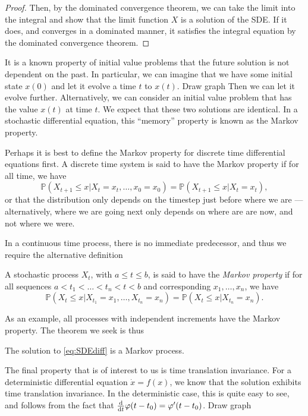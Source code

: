 \documentclass[prb,12pt]{revtex4-2}
\theoremstyle{definition}
\theoremstyle{definition}
\theoremstyle{definition}
\begin{document}
{\begin{proof}
{		Then, by the dominated convergence theorem, we can take the limit into the integral and show that the limit function $X$ is a solution of the SDE.
		}
		If it does, and converges in a dominated manner, it satisfies the integral equation by the dominated convergence theorem. 
	\end{proof}
	It is a known property of initial value problems that the future solution is not dependent on the past. In particular, we can imagine that we have some initial state $x(0)$ and let it evolve a time $t$ to $x(t)$. {\color{red} Draw graph} Then we can let it evolve further. Alternatively, we can consider an initial value problem that has the value $x(t)$ at time $t$. We expect that these two solutions are identical. In a stochastic differential equation, this ``memory'' property is known as the Markov property. {\color{red} Perhaps it is best to define the Markov property for discrete time differential equations first. A discrete time system is said to have the Markov property if for all time, we have
		\[\mathbb{P}(X_{t+1} \le x | X_t = x_t, \dots, x_0 = x_0) = \mathbb{P}(X_{t+1} \le x | X_t = x_t),\]
		or that the distribution only depends on the timestep just before where we are --- alternatively, where we are going next only depends on where are are now, and not where we were.
		
		In a continuous time process, there is no immediate predecessor, and thus we require the alternative definition} 
	\begin{Definition}
		A stochastic process $X_t$, with $a\le t \le b$, is said to have the \emph{Markov property} if for all sequences $a < t_1 < \dots < t_n < t < b$ and corresponding $x_1, \dots, x_n$, we have
		\[
		\mathbb{P}(X_t\le x|X_{t_1}=x_1, \dots, X_{t_n}=x_n) = \mathbb{P}(X_t\le x|X_{t_n}=x_n)
		.\] 
	\end{Definition}
	As an example, all processes with independent increments have the Markov property. The theorem we seek is thus
	
	\begin{Theorem}
		The solution to \eqref{eq:SDEdiff} is a Markov process.
	\end{Theorem}
	
	The final property that is of interest to us is time translation invariance. For a deterministic differential equation $\dot{x} = f(x)$, we know that the solution exhibits time translation invariance. In the deterministic case, this is quite easy to see, and follows from the fact that $\dv{t}\varphi(t - t_0) = \varphi'(t-t_0)$. {\color{red} Draw graph}
	
}
\end{document}
